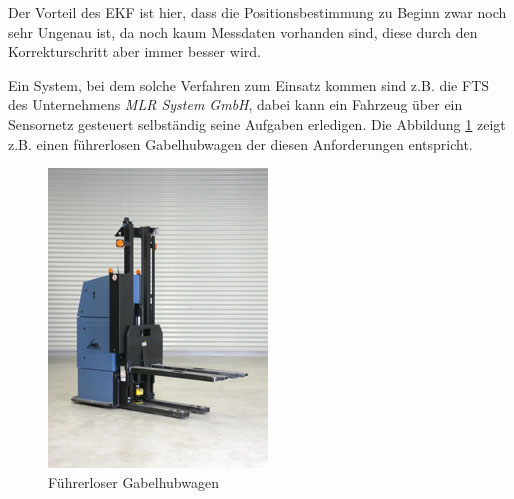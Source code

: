 Der Vorteil des \ac{EKF} ist hier, dass die Positionsbestimmung zu
Beginn zwar noch sehr Ungenau ist, da noch kaum Messdaten vorhanden
sind, diese durch den Korrekturschritt aber immer besser wird.

Ein System, bei dem solche Verfahren zum Einsatz kommen sind z.B. die
\ac{FTS} des Unternehmens \textit{MLR System GmbH}, dabei kann ein
Fahrzeug über ein Sensornetz gesteuert selbständig seine Aufgaben
erledigen. Die Abbildung \ref{fig:fg} zeigt z.B. einen führerlosen
Gabelhubwagen der diesen Anforderungen entspricht.

\begin{figure}[h!]
  \centering
  \includegraphics[scale=1.0]{img/Fahr_Gabelhubwagen}

  \caption{Führerloser Gabelhubwagen}
  \label{fig:fg}
\end{figure}

